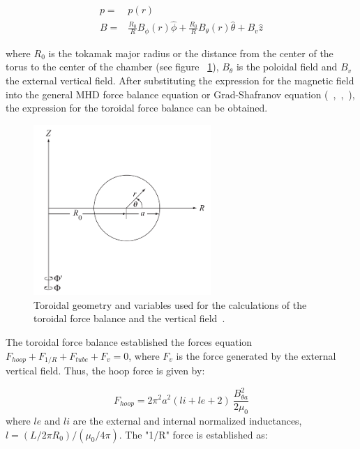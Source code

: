 	\begin{equation}
	\begin{aligned}
	p=&p(r)\\
	B =& \frac{R_0}{R}B_{\phi}(r) \hat{\phi} + \frac{R_0}{R}B_{\theta}(r)\hat{\theta}+B_v \hat{z}
	\end{aligned}
	\end{equation}
	
where $R_0$ is the tokamak major radius or the distance from the center of the torus to the center of the chamber (see figure ~\ref{tor_geo}), $B_{\theta}$ is the poloidal field and $B_v$ the external vertical field. After substituting the expression for the magnetic field into the general MHD force balance equation or Grad-Shafranov equation (~\cite[Chapter~6]{Miyamoto2011},~\cite[Chapter~11]{Freidberg2007},~\cite[Chpater~2]{Zohm2015}), the expression for the toroidal force balance can be obtained.
\smallskip

\begin{figure}
	\centering
	\includegraphics[width=0.6\textwidth]{Chp1/toroidal_geo.png}
	\caption{  Toroidal geometry and variables used for the calculations of the toroidal force balance and the vertical field~\cite[Chapter~11]{Freidberg2007}.\label{tor_geo}}
\end{figure}


The toroidal force balance established the forces equation $F_{hoop}+ F_{1/R} + F_{tube}+ F_{v} =0$, where $F_v$ is the force generated by the external vertical field. Thus, the hoop force is given by:

\begin{equation}
F_{hoop}=2\pi^2a^2(li+le+2)~\frac{B_{\theta a}^2}{2\mu_0}
\end{equation}
 where $le$ and $li$ are the external and internal normalized inductances, $l= (L/2\pi R_0)/(\mu_0/4\pi)$. The "1/R" force is established as:
 
